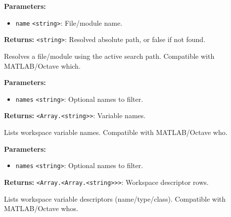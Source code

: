 \documentclass[12pt,a4paper]{article}
\begin{document}
\vspace{5mm}
\noindent {}


\noindent \textbf{Parameters:}
\begin{itemize}
  \item \texttt{name} \texttt{<string>}: File/module name.
\end{itemize}

\noindent \textbf{Returns:} \texttt{<string>}: Resolved absolute path, or false if not found.

\noindent Resolves a file/module using the active search path.
Compatible with MATLAB/Octave \textasciigrave{}which\textasciigrave{}.

\vspace{5mm}
\noindent {}


\noindent \textbf{Parameters:}
\begin{itemize}
  \item \texttt{names} \texttt{<string>}: Optional names to filter.
\end{itemize}

\noindent \textbf{Returns:} \texttt{<Array.<string>>}: Variable names.

\noindent Lists workspace variable names.
Compatible with MATLAB/Octave \textasciigrave{}who\textasciigrave{}.

\vspace{5mm}
\noindent {}


\noindent \textbf{Parameters:}
\begin{itemize}
  \item \texttt{names} \texttt{<string>}: Optional names to filter.
\end{itemize}

\noindent \textbf{Returns:} \texttt{<Array.<Array.<string>>>}: Workspace descriptor rows.

\noindent Lists workspace variable descriptors (name/type/class).
Compatible with MATLAB/Octave \textasciigrave{}whos\textasciigrave{}.

\vspace{5mm}
\noindent {}
\end{document}

